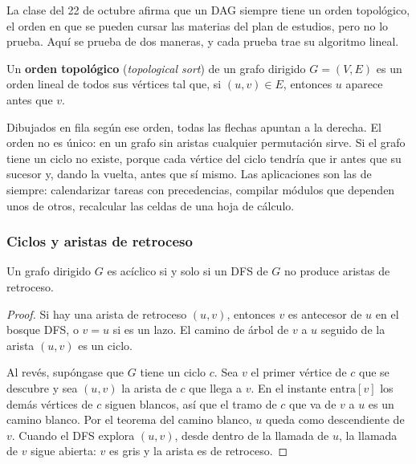 \documentclass[11pt,letterpaper]{article}
\begin{document}
La clase del 22 de octubre afirma que un DAG siempre tiene un orden
topológico, el orden en que se pueden cursar las materias del plan de
estudios, pero no lo prueba. Aquí se prueba de dos maneras, y cada
prueba trae su algoritmo lineal.

\begin{definicion}
  \label{def:orden-topologico}
  Un \textbf{orden topológico} (\textit{topological sort}) de un grafo
  dirigido $G = (V, E)$ es un orden lineal de todos sus vértices tal
  que, si $(u, v) \in E$, entonces $u$ aparece antes que $v$.
\end{definicion}

Dibujados en fila según ese orden, todas las flechas apuntan a la
derecha. El orden no es único: en un grafo sin aristas cualquier
permutación sirve. Si el grafo tiene un ciclo no existe, porque cada
vértice del ciclo tendría que ir antes que su sucesor y, dando la
vuelta, antes que sí mismo. Las aplicaciones son las de siempre:
calendarizar tareas con precedencias, compilar módulos que dependen
unos de otros, recalcular las celdas de una hoja de cálculo.

\subsubsection*{Ciclos y aristas de retroceso}

\begin{lema}
  \label{lem:aciclico-retroceso}
  Un grafo dirigido $G$ es acíclico si y solo si un DFS de $G$ no
  produce aristas de retroceso.
\end{lema}

\begin{proof}
  Si hay una arista de retroceso $(u, v)$, entonces $v$ es antecesor de
  $u$ en el bosque DFS, o $v = u$ si es un lazo. El camino de árbol de
  $v$ a $u$ seguido de la arista $(u, v)$ es un ciclo.

  Al revés, supóngase que $G$ tiene un ciclo $c$. Sea $v$ el primer
  vértice de $c$ que se descubre y sea $(u, v)$ la arista de $c$ que
  llega a $v$. En el instante $\text{entra}[v]$ los demás vértices de
  $c$ siguen blancos, así que el tramo de $c$ que va de $v$ a $u$ es un
  camino blanco. Por el teorema del camino blanco, $u$ queda como
  descendiente de $v$. Cuando el DFS explora $(u, v)$, desde dentro de
  la llamada de $u$, la llamada de $v$ sigue abierta: $v$ es gris y la
  arista es de retroceso.
\end{proof}
\end{document}
